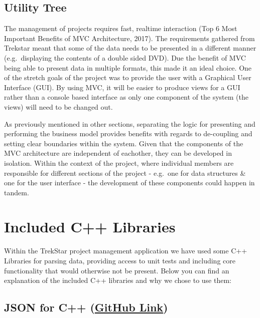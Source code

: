 \documentclass[
  english,
  a4paper,
,tablecaptionabove
]{scrartcl}
\begin{document}
\hypertarget{utility-tree}{%
\subsection{Utility Tree}\label{utility-tree}}

The management of projects requires fast, realtime interaction (Top 6
Most Important Benefits of MVC Architecture, 2017). The requirements
gathered from Trekstar meant that some of the data needs to be presented
in a different manner (e.g.~displaying the contents of a double sided
DVD). Due the benefit of MVC being able to present data in multiple
formats, this made it an ideal choice. One of the stretch goals of the
project was to provide the user with a Graphical User Interface (GUI).
By using MVC, it will be easier to produce views for a GUI rather than a
console based interface as only one component of the system (the views)
will need to be changed out.

As previously mentioned in other sections, separating the logic for
presenting and performing the business model provides benefits with
regards to de-coupling and setting clear boundaries within the system.
Given that the components of the MVC architecture are independent of
eachother, they can be developed in isolation. Within the context of the
project, where individual members are responsible for different sections
of the project - e.g.~one for data structures \& one for the user
interface - the development of these components could happen in tandem.

\newpage

\hypertarget{included-c-libraries}{%
\section{Included C++ Libraries}\label{included-c-libraries}}

Within the TrekStar project management application we have used some C++
Libraries for parsing data, providing access to unit tests and including
core functionality that would otherwise not be present. Below you can
find an explanation of the included C++ libraries and why we chose to
use them:

\hypertarget{json-for-c-github-link}{%
\subsection{\texorpdfstring{JSON for C++
(\href{https://github.com/nlohmann/json}{GitHub
Link})}{JSON for C++ (GitHub Link)}}\label{json-for-c-github-link}}
\end{document}
